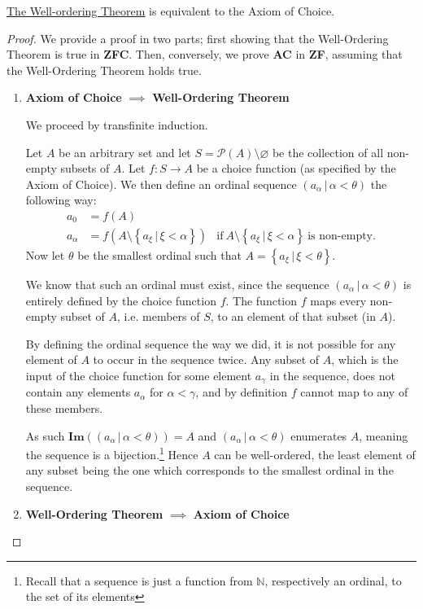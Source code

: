\documentclass[../../main.tex]{subfiles}
\begin{document}
\begin{theorem}\label{well-order-thm-equivalence}\cite[Theorem 15, p.39]{Jec78}
    \hyperref[well-order-thm]{The Well-ordering Theorem} is equivalent to the Axiom of Choice. %
\end{theorem}

\begin{proof}
    We provide a proof in two parts; first showing that the Well-Ordering Theorem is true in \textbf{ZFC}.
    Then, conversely, we prove \textbf{AC} in \textbf{ZF}, assuming that the Well-Ordering Theorem holds true.
    \begin{enumerate}
        \item \textbf{Axiom of Choice} $\implies$ \textbf{Well-Ordering Theorem}
        
        We proceed by transfinite induction.

        Let $A$ be an arbitrary set and let $S = \mathcal{P}(A) \setminus \varnothing$ be the collection of all non-empty subsets of $A$.
        Let $f: S \to A$ be a choice function (as specified by the Axiom of Choice).
        We then define an ordinal sequence $\left(a_{\alpha} \, \vert \, \alpha < \theta \right)$ the following way:
        \begin{align*}
            a_0 &= f(A)\\
            a_{\alpha} &= f\left(A \setminus \left\{a_\xi \, \vert \, \xi < \alpha\right\} \right)
            &\text{if}\ A \setminus \left\{a_\xi \, \vert \, \xi < \alpha\right\}\ \text{is non-empty}.
        \end{align*}
        Now let $\theta$ be the smallest ordinal such that $A = \left\{a_\xi \, \vert \, \xi < \theta\right\}$.
        
        We know that such an ordinal must exist, since the sequence $\left(a_{\alpha} \, \vert \, \alpha < \theta \right)$ is entirely defined by the choice function $f$.
        The function $f$ maps every non-empty subset of $A$, i.e. members of $S$, to an element of that subset (in $A$).
        
        By defining the ordinal sequence the way we did, it is not possible for any element of $A$ to occur in the sequence twice.
        Any subset of $A$, which is the input of the choice function for some element $a_\gamma$ in the sequence, does not contain any elements $a_\alpha$ for $\alpha < \gamma$, and by definition $f$ cannot map to any of these members.
        
        As such $\mathbf{Im}\left(\left(a_{\alpha} \, \vert \, \alpha < \theta \right)\right) = A$
        and $\left(a_{\alpha} \, \vert \, \alpha < \theta \right)$ enumerates $A$, meaning the sequence is a bijection.\footnote{Recall that a sequence is just a function from $\mathbb{N}$, respectively an ordinal, to the set of its elements}
        Hence $A$ can be well-ordered, the least element of any subset being the one which corresponds to the smallest ordinal in the sequence.
        \item \textbf{Well-Ordering Theorem} $\implies$ \textbf{Axiom of Choice}
        

\end{enumerate}
\end{proof}
\end{document}
